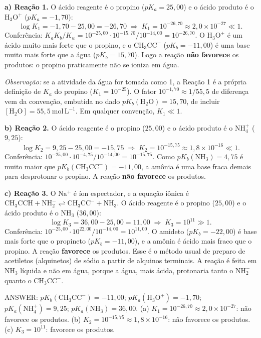 \documentclass{article}%
\begin{document}
\textbf{a) Reação 1.} O ácido reagente é o propino ($pK_a=25{,}00$) e o ácido produto é o $\mathrm{H_3O^+}$ ($pK_a=-1{,}70$):
\[
\log K_1=-1{,}70-25{,}00=-26{,}70\;\Rightarrow\;K_1=10^{-26{,}70}\approx 2{,}0\times10^{-27}\ll 1 .
\]
Conferência: $K_aK_b/K_w=10^{-25{,}00}\cdot10^{-15{,}70}/10^{-14{,}00}=10^{-26{,}70}$. O $\mathrm{H_3O^+}$ é um ácido muito mais forte que o propino, e o $\mathrm{CH_3CC^-}$ ($pK_b=-11{,}00$) é uma base muito mais forte que a água ($pK_b=15{,}70$). Logo a reação \textbf{não favorece} os produtos: o propino praticamente não se ioniza em água.

\emph{Observação:} se a atividade da água for tomada como 1, a Reação 1 é a própria definição de $K_a$ do propino ($K_1=10^{-25}$). O fator $10^{-1{,}70}\approx 1/55{,}5$ de diferença vem da convenção, embutida no dado $pK_b(\mathrm{H_2O})=15{,}70$, de incluir $[\mathrm{H_2O}]=55{,}5\ \mathrm{mol\,L^{-1}}$. Em qualquer convenção, $K_1\ll1$.

\textbf{b) Reação 2.} O ácido reagente é o propino ($25{,}00$) e o ácido produto é o $\mathrm{NH_4^+}$ ($9{,}25$):
\[
\log K_2=9{,}25-25{,}00=-15{,}75\;\Rightarrow\;K_2=10^{-15{,}75}\approx 1{,}8\times10^{-16}\ll 1 .
\]
Conferência: $10^{-25{,}00}\cdot10^{-4{,}75}/10^{-14{,}00}=10^{-15{,}75}$. Como $pK_b(\mathrm{NH_3})=4{,}75$ é muito maior que $pK_b(\mathrm{CH_3CC^-})=-11{,}00$, a amônia é uma base fraca demais para desprotonar o propino. A reação \textbf{não favorece} os produtos.

\textbf{c) Reação 3.} O $\mathrm{Na^+}$ é íon espectador, e a equação iônica é $\mathrm{CH_3CCH}+\mathrm{NH_2^-}\rightleftharpoons \mathrm{CH_3CC^-}+\mathrm{NH_3}$. O ácido reagente é o propino ($25{,}00$) e o ácido produto é o $\mathrm{NH_3}$ ($36{,}00$):
\[
\log K_3=36{,}00-25{,}00=11{,}00\;\Rightarrow\;K_3=10^{11}\gg 1 .
\]
Conferência: $10^{-25{,}00}\cdot10^{22{,}00}/10^{-14{,}00}=10^{11{,}00}$. O amideto ($pK_b=-22{,}00$) é base mais forte que o propineto ($pK_b=-11{,}00$), e a amônia é ácido mais fraco que o propino. A reação \textbf{favorece} os produtos. Esse é o método usual de preparo de acetiletos (alquinetos) de sódio a partir de alquinos terminais. A reação é feita em $\mathrm{NH_3}$ líquida e não em água, porque a água, mais ácida, protonaria tanto o $\mathrm{NH_2^-}$ quanto o $\mathrm{CH_3CC^-}$.

ANSWER: $pK_b(\mathrm{CH_3CC^-})=-11{,}00$; $pK_a(\mathrm{H_3O^+})=-1{,}70$; $pK_a(\mathrm{NH_4^+})=9{,}25$; $pK_a(\mathrm{NH_3})=36{,}00$. (a) $K_1=10^{-26{,}70}\approx2{,}0\times10^{-27}$: não favorece os produtos. (b) $K_2=10^{-15{,}75}\approx1{,}8\times10^{-16}$: não favorece os produtos. (c) $K_3=10^{11}$: favorece os produtos.%
\newpage%
\end{document}
